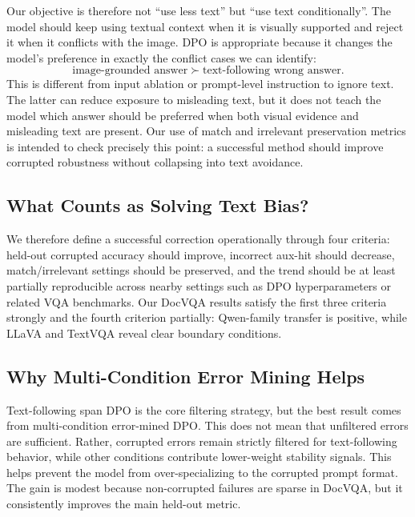 Our objective is therefore not ``use less text'' but ``use text conditionally''.
The model should keep using textual context when it is visually supported and reject it when it conflicts with the image.
DPO is appropriate because it changes the model's preference in exactly the conflict cases we can identify:
\begin{equation}
\text{image-grounded answer} \succ \text{text-following wrong answer}.
\end{equation}
This is different from input ablation or prompt-level instruction to ignore text.
The latter can reduce exposure to misleading text, but it does not teach the model which answer should be preferred when both visual evidence and misleading text are present.
Our use of match and irrelevant preservation metrics is intended to check precisely this point: a successful method should improve corrupted robustness without collapsing into text avoidance.

\subsection{What Counts as Solving Text Bias?}

We therefore define a successful correction operationally through four criteria:
held-out corrupted accuracy should improve, incorrect aux-hit should decrease, match/irrelevant settings should be preserved, and the trend should be at least partially reproducible across nearby settings such as DPO hyperparameters or related VQA benchmarks.
Our DocVQA results satisfy the first three criteria strongly and the fourth criterion partially: Qwen-family transfer is positive, while LLaVA and TextVQA reveal clear boundary conditions.

\subsection{Why Multi-Condition Error Mining Helps}

Text-following span DPO is the core filtering strategy, but the best result comes from multi-condition error-mined DPO.
This does not mean that unfiltered errors are sufficient.
Rather, corrupted errors remain strictly filtered for text-following behavior, while other conditions contribute lower-weight stability signals.
This helps prevent the model from over-specializing to the corrupted prompt format.
The gain is modest because non-corrupted failures are sparse in DocVQA, but it consistently improves the main held-out metric.

